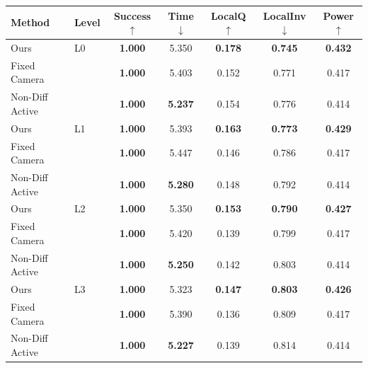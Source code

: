 \begin{tabular}{llccccc}
\toprule
Method & Level & Success $\uparrow$ & Time $\downarrow$ & LocalQ $\uparrow$ & LocalInv $\downarrow$ & Power $\uparrow$ \\
\midrule
Ours & L0 & \textbf{1.000} & 5.350 & \textbf{0.178} & \textbf{0.745} & \textbf{0.432} \\
Fixed Camera &  & \textbf{1.000} & 5.403 & 0.152 & 0.771 & 0.417 \\
Non-Diff Active &  & \textbf{1.000} & \textbf{5.237} & 0.154 & 0.776 & 0.414 \\
\midrule
Ours & L1 & \textbf{1.000} & 5.393 & \textbf{0.163} & \textbf{0.773} & \textbf{0.429} \\
Fixed Camera &  & \textbf{1.000} & 5.447 & 0.146 & 0.786 & 0.417 \\
Non-Diff Active &  & \textbf{1.000} & \textbf{5.280} & 0.148 & 0.792 & 0.414 \\
\midrule
Ours & L2 & \textbf{1.000} & 5.350 & \textbf{0.153} & \textbf{0.790} & \textbf{0.427} \\
Fixed Camera &  & \textbf{1.000} & 5.420 & 0.139 & 0.799 & 0.417 \\
Non-Diff Active &  & \textbf{1.000} & \textbf{5.250} & 0.142 & 0.803 & 0.414 \\
\midrule
Ours & L3 & \textbf{1.000} & 5.323 & \textbf{0.147} & \textbf{0.803} & \textbf{0.426} \\
Fixed Camera &  & \textbf{1.000} & 5.390 & 0.136 & 0.809 & 0.417 \\
Non-Diff Active &  & \textbf{1.000} & \textbf{5.227} & 0.139 & 0.814 & 0.414 \\
\bottomrule
\end{tabular}